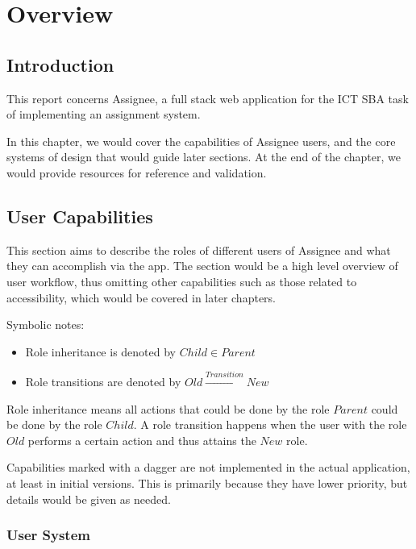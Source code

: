 \chapter{Overview}
\label{overview}

\section{Introduction}
\label{overview.intro}

This report concerns Assignee, a full stack web application for the ICT SBA task
of implementing an assignment system.

In this chapter, we would cover the capabilities of Assignee users, and the core
systems of design that would guide later sections. At the end of the chapter, we
would provide resources for reference and validation.

\section{User Capabilities}
\label{overview.capab}

This section aims to describe the roles of different users of Assignee and what they
can accomplish via the app. The section would be a high level overview of user
workflow, thus omitting other capabilities such as those related to accessibility,
which would be covered in later chapters.

Symbolic notes:
\begin{itemize}
	\item Role inheritance is denoted by $Child \in Parent$

	\item Role transitions are denoted by $Old \xrightarrow{Transition}New$
\end{itemize}

Role inheritance means all actions that could be done by the role $Parent$ could
be done by the role $Child$. A role transition happens when the user with the role
$Old$ performs a certain action and thus attains the $New$ role.

Capabilities marked with a dagger \textdagger{} are not implemented in the
actual application, at least in initial versions. This is primarily because they
have lower priority, but details would be given as needed.

\subsection{User System}
\label{overview.capab.user}

